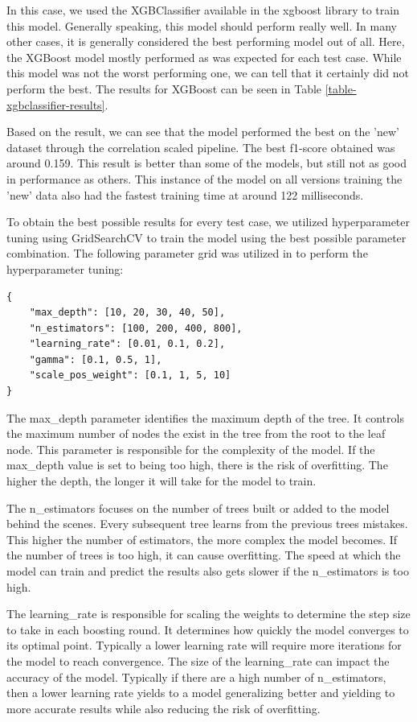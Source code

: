 In this case, we used the XGBClassifier available in the xgboost library to train this model. Generally speaking, this model should perform really well. In many other cases, it is generally considered the best performing model out of all. Here, the XGBoost model mostly performed as was expected for each test case. While this model was not the worst performing one, we can tell that it certainly did not perform the best. The results for XGBoost can be seen in Table \ref{table-xgbclassifier-results}.



Based on the result, we can see that the model performed the best on the 'new' dataset through the correlation scaled pipeline. The best f1-score obtained was around 0.159. This result is better than some of the models, but still not as good in performance as others. This instance of the model on all versions training the 'new' data also had the fastest training time at around 122 milliseconds.

To obtain the best possible results for every test case, we utilized hyperparameter tuning using GridSearchCV to train the model using the best possible parameter combination. 
The following parameter grid was utilized in to perform the hyperparameter tuning:

\begin{lstlisting}
{
    "max_depth": [10, 20, 30, 40, 50],
    "n_estimators": [100, 200, 400, 800],
    "learning_rate": [0.01, 0.1, 0.2],
    "gamma": [0.1, 0.5, 1],
    "scale_pos_weight": [0.1, 1, 5, 10]
}
\end{lstlisting}

The max\_depth parameter identifies the maximum depth of the tree. It controls the maximum number of nodes the exist in the tree from the root to the leaf node. This parameter is responsible for the complexity of the model. If the max\_depth value is set to being too high, there is the risk of overfitting. The higher the depth, the longer it will take for the model to train.

The n\_estimators focuses on the number of trees built or added to the model behind the scenes. Every subsequent tree learns from the previous trees mistakes. This higher the number of estimators, the more complex the model becomes. If the number of trees is too high, it can cause overfitting. The speed at which the model can train and predict the results also gets slower if the n\_estimators is too high. 

The learning\_rate is responsible for scaling the weights to determine the step size to take in each boosting round. It determines how quickly the model converges to its optimal point. Typically a lower learning rate will require more iterations for the model to reach convergence. The size of the learning\_rate can impact the accuracy of the model. Typically if there are a high number of n\_estimators, then a lower learning rate yields to a model generalizing better and yielding to more accurate results while also reducing the risk of overfitting. 

